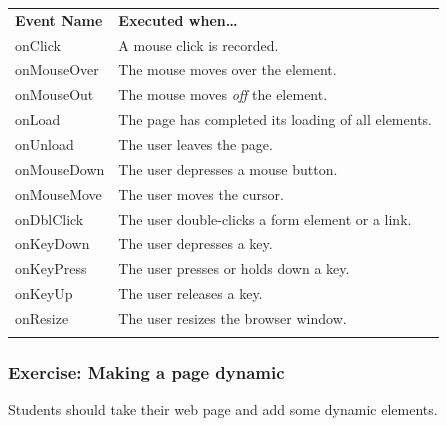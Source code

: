 \documentclass[11pt]{article}
\begin{document}
\begin{center}
\begin{tabular}{lp{3.5in}} \\
\textbf{Event Name} & \textbf{Executed when\ldots} \\
onClick & A mouse click is recorded. \\
onMouseOver & The mouse moves over the element. \\
onMouseOut & The mouse moves \emph{off} the element. \\
onLoad & The page has completed its loading of all elements.\\
onUnload & The user leaves the page. \\
onMouseDown & The user depresses a mouse button. \\
onMouseMove & The user moves the cursor. \\
onDblClick & The user double-clicks a form element or a link. \\
onKeyDown & The user depresses a key.\\
onKeyPress & The user presses or holds down a key.\\
onKeyUp & The user releases a key. \\
onResize & The user resizes the browser window. \\
   &   \\
 \end{tabular}
 \end{center}



\subsubsection{Exercise: Making a page dynamic}

Students should take their web page and add some dynamic elements.
\end{document}
